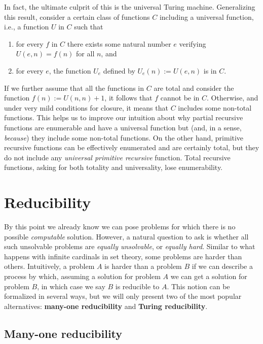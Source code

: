 \documentclass[../main.tex]{memoir}
\begin{document}
In fact, the ultimate culprit of this is the universal Turing machine. Generalizing this result, consider a certain class of functions $C$ including a universal function, i.e., a function $U$ in $C$ such that

\begin{enumerate}
\item for every $f$ in $C$ there exists some natural number $e$ verifying $U(e, n) = f(n)$ for all $n$, and
\item for every $e$, the function $U_e$ defined by $U_e(n) := U(e, n)$ is in $C$.
\end{enumerate}

If we further assume that all the functions in $C$ are total and consider the function $f(n) := U(n, n) + 1$, it follows that $f$ cannot be in $C$. Otherwise, and under very mild conditions for closure, it means that $C$ includes some non-total functions. This helps us to improve our intuition about why partial recursive functions are enumerable and have a universal function but (and, in a sense, \textit{because}) they include some non-total functions. On the other hand, primitive recursive functions can be effectively enumerated and are certainly total, but they do not include any \textit{universal primitive recursive} function. Total recursive functions, asking for both totality and universality, lose enumerability.

\section{Reducibility}

By this point we already know we can pose problems for which there is no possible \textit{computable} solution. However, a natural question to ask is whether all such unsolvable problems are \textit{equally unsolvable}, or \textit{equally hard}. Similar to what happens with infinite cardinals in set theory, some problems are harder than others. Intuitively, a problem $A$ is harder than a problem $B$ if we can describe a process by which, assuming a solution for problem $A$ we can get a solution for problem $B$, in which case we say $B$ is reducible to $A$. This notion can be formalized in several ways, but we will only present two of the most popular alternatives: \textbf{many-one reducibility} and \textbf{Turing reducibility}.

\subsection{Many-one reducibility}
\end{document}
